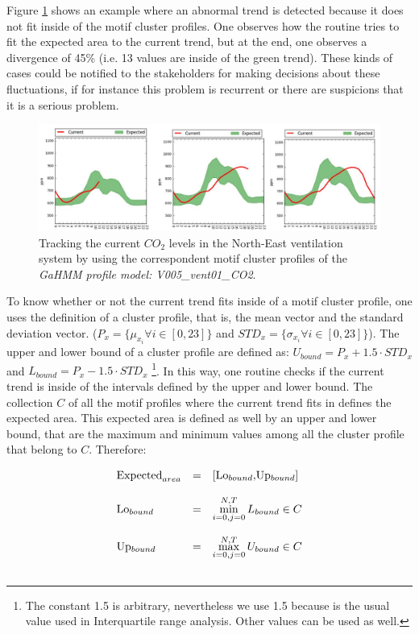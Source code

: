 Figure \ref{fig:real_time_2} shows an example where an abnormal trend is detected because it does not fit inside of the motif cluster profiles. One observes how the routine tries to fit the expected area to the current trend, but at the end, one observes a divergence of 45\% (i.e. 13 values are inside of the green trend). These kinds of cases could be notified to the stakeholders for making decisions about these fluctuations, if for instance this problem is recurrent or there are suspicions that it is a serious problem.

\begin{figure}[h!]
  \vspace{0.5em} %
  \includegraphics[scale=0.7]{Figures/real_time_2.jpg}
  \caption{Tracking the current $CO_2$ levels in the North-East ventilation system by using the correspondent motif cluster profiles of the \textit{GaHMM  profile model: V005\_vent01\_CO2}.}
  \label{fig:real_time_2}
\end{figure}

To know whether or not the current trend fits inside of a motif cluster profile, one uses the definition of a cluster profile, that is, the mean vector and the standard deviation vector. ($P_x = \{ \mu_{x_i} \forall i \in [0,23] \}$  and $STD_x = \{ \sigma_{x_i} \forall i \in [0,23] \}$). The upper and lower bound of a cluster profile are defined as: $U_{bound} = P_x + 1.5 \cdot STD_x$ and $L_{bound} = P_x - 1.5 \cdot STD_x$ \footnote{The constant 1.5 is arbitrary, nevertheless we use 1.5 because is the usual value used in Interquartile range analysis. Other values can be used as well.}. In this way, one routine checks if the current trend is inside of the intervals defined by the upper and lower bound. The collection $C$ of all the motif profiles where the current trend fits in defines the expected area. This expected area is defined as well by an upper and lower bound, that are the maximum and minimum values among all the cluster profile that belong to $C$. Therefore:


\begin{equation}
\begin{array}{lcl}
\textstyle  \text{Expected}_{area} & = & [$Lo$_{bound}, $Up$_{bound}] \\ \\
 $Lo$_{bound} & = & \displaystyle \min_{i=0,j=0}^{N,T} L_{bound} \in C  \\	\\
 $Up$_{bound} & = & \displaystyle \max_{i=0,j=0}^{N,T} U_{bound} \in C  	\\	\\
\end{array}
\end{equation}



